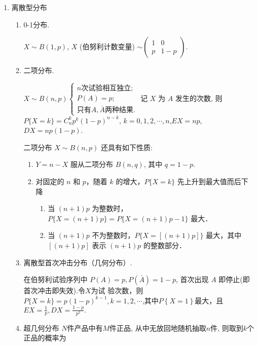 \begin{enumerate}
      \item 离散型分布
            \begin{enumerate}
                  \item 0-1分布.

                        $X \sim B(1,p)$, $X$ (伯努利计数变量) $\sim \begin{pmatrix} 1 & 0 \\ p & 1-p \end{pmatrix}$.
                  \item 二项分布.

                        $X \sim B(n,p) \begin{cases} n\text{次试验相互独立;} \\ P(A) = p; \\ \text{只有}A, \overline{A}\text{两种结果}. \end{cases}$
                        记 $X$ 为 $A$ 发生的次数, 则$P\{X = k\} = C_n^k p^k (1-p)^{n-k}$, $k = 0, 1, 2, \cdots, n$,$EX = np$, $DX = np(1-p)$.

                        二项分布 $X \sim B(n,p)$ 还具有如下性质:
                        \begin{enumerate}
                              \item $Y = n - X$ 服从二项分布 $B(n,q)$, 其中 $q = 1 - p$.
                              \item 对固定的 $n$ 和 $p$，随着 $k$ 的增大，$P\{X=k\}$ 先上升到最大值而后下降
                                    \begin{enumerate}
                                          \item 当 $(n+1)p$ 为整数时，$P\{X=(n+1)p\} = P\{X=(n+1)p-1\}$ 最大．
                                          \item 当 $(n+1)p$ 不为整数时，$P\{X=\left[(n+1)p\right]\}$ 最大，其中 $\left[(n+1)p\right]$ 表示 $(n+1)p$ 的整数部分．
                                    \end{enumerate}
                        \end{enumerate}
                  \item 离散型首次冲击分布（几何分布）.

                        在伯努利试验序列中 $P(A)=p,P(\bar{A})=1-p$, 首次出现 $A$ 即停止(即首次冲击即失效).令$X$为试
                        验次数，则$P\{X=k\}=p(1-p)^{k-1},k=1,2,\cdots$,其中$P\left\{X=1\right\}$最大，且$EX=\frac1p,DX=\frac{1-p}{p^{2}}.$
                  \item 超几何分布
                        $N$件产品中有$M$件正品, 从中无放回地随机抽取$n$件, 则取到$k$个正品的概率为


\end{enumerate}
\end{enumerate}
